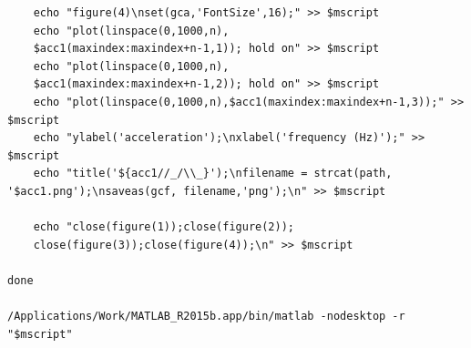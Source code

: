 \documentclass{sigchi}
\begin{document}
\begin{lstlisting}
	echo "figure(4)\nset(gca,'FontSize',16);" >> $mscript
	echo "plot(linspace(0,1000,n),
    $acc1(maxindex:maxindex+n-1,1)); hold on" >> $mscript
	echo "plot(linspace(0,1000,n),
    $acc1(maxindex:maxindex+n-1,2)); hold on" >> $mscript
	echo "plot(linspace(0,1000,n),$acc1(maxindex:maxindex+n-1,3));" >> $mscript
	echo "ylabel('acceleration');\nxlabel('frequency (Hz)');" >> $mscript
	echo "title('${acc1//_/\\_}');\nfilename = strcat(path, '$acc1.png');\nsaveas(gcf, filename,'png');\n" >> $mscript

	echo "close(figure(1));close(figure(2));
    close(figure(3));close(figure(4));\n" >> $mscript

done

/Applications/Work/MATLAB_R2015b.app/bin/matlab -nodesktop -r "$mscript"
\end{lstlisting}
\end{document}
